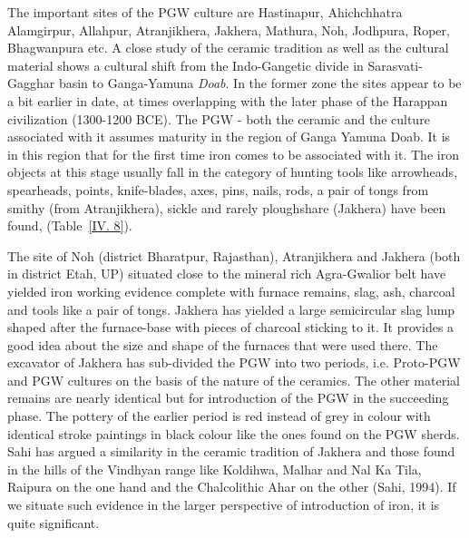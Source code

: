 The important sites of the PGW culture are Hastinapur, Ahichchhatra Alamgirpur, Allahpur, Atranjikhera, Jakhera, Mathura, Noh, Jodhpura, Roper, Bhagwanpura etc. A close study of the ceramic tradition as well as the cultural material shows a cultural shift from the Indo-Gangetic divide in Sarasvati-Gagghar basin to Ganga-Yamuna \textit{Doab}. In the former zone the sites appear to be a bit earlier in date, at times overlapping with the later phase of the Harappan civilization (1300-1200 BCE). The PGW - both the ceramic and the culture associated with it assumes maturity in the region of Ganga Yamuna Doab. It is in this region that for the first time iron comes to be associated with it.  The iron objects at this stage usually fall in the category of hunting tools like arrowheads, spearheads, points, knife-blades, axes, pins, nails, rods, a pair of tongs from smithy (from Atranjikhera), sickle and rarely ploughshare (Jakhera) have been found, (Table~\ref{IV. 8}). 

The site of Noh (district Bharatpur, Rajasthan), Atranjikhera and Jakhera (both in district Etah, UP) situated close to the mineral rich Agra-Gwalior belt have yielded iron working evidence complete with furnace remains, slag, ash, charcoal and tools like a pair of tongs. Jakhera has yielded a large semicircular slag lump shaped after the furnace-base with pieces of charcoal sticking to it. It provides a good idea about the size and shape of the furnaces that were used there. The excavator of Jakhera has sub-divided the PGW into two periods, i.e. Proto-PGW and PGW cultures on the basis of the nature of the ceramics. The other material remains are nearly identical but for introduction of the PGW in the succeeding phase. The pottery of the earlier period is red instead of grey in colour with identical stroke paintings in black colour like the ones found on the PGW sherds. Sahi has argued a similarity in the ceramic tradition of Jakhera and those found in the hills of the Vindhyan range like Koldihwa, Malhar and Nal Ka Tila, Raipura on the one hand and the Chalcolithic Ahar on the other (Sahi, 1994). If we situate such evidence in the larger perspective of introduction of iron, it is quite significant.

